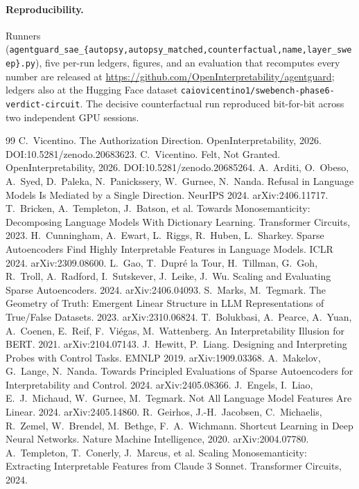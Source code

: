 \documentclass[11pt]{article}
\begin{document}
\paragraph{Reproducibility.} Runners (\texttt{agentguard\_sae\_\{autopsy,autopsy\_matched,counterfactual,name,layer\_sweep\}.py}),
five per-run ledgers, figures, and an evaluation that recomputes every number are released at
\url{https://github.com/OpenInterpretability/agentguard}; ledgers also at the Hugging Face dataset
\texttt{caiovicentino1/swebench-phase6-verdict-circuit}. The decisive counterfactual run reproduced
bit-for-bit across two independent GPU sessions.

\begin{thebibliography}{99}
 C.~Vicentino. The Authorization Direction. OpenInterpretability, 2026. DOI:10.5281/zenodo.20683623.
 C.~Vicentino. Felt, Not Granted. OpenInterpretability, 2026. DOI:10.5281/zenodo.20685264.
 A.~Arditi, O.~Obeso, A.~Syed, D.~Paleka, N.~Panickssery, W.~Gurnee, N.~Nanda. Refusal in Language Models Is Mediated by a Single Direction. NeurIPS 2024. arXiv:2406.11717.
 T.~Bricken, A.~Templeton, J.~Batson, et al. Towards Monosemanticity: Decomposing Language Models With Dictionary Learning. Transformer Circuits, 2023.
 H.~Cunningham, A.~Ewart, L.~Riggs, R.~Huben, L.~Sharkey. Sparse Autoencoders Find Highly Interpretable Features in Language Models. ICLR 2024. arXiv:2309.08600.
 L.~Gao, T.~Dupr\'e la Tour, H.~Tillman, G.~Goh, R.~Troll, A.~Radford, I.~Sutskever, J.~Leike, J.~Wu. Scaling and Evaluating Sparse Autoencoders. 2024. arXiv:2406.04093.
 S.~Marks, M.~Tegmark. The Geometry of Truth: Emergent Linear Structure in LLM Representations of True/False Datasets. 2023. arXiv:2310.06824.
 T.~Bolukbasi, A.~Pearce, A.~Yuan, A.~Coenen, E.~Reif, F.~Vi\'egas, M.~Wattenberg. An Interpretability Illusion for BERT. 2021. arXiv:2104.07143.
 J.~Hewitt, P.~Liang. Designing and Interpreting Probes with Control Tasks. EMNLP 2019. arXiv:1909.03368.
 A.~Makelov, G.~Lange, N.~Nanda. Towards Principled Evaluations of Sparse Autoencoders for Interpretability and Control. 2024. arXiv:2405.08366.
 J.~Engels, I.~Liao, E.~J.~Michaud, W.~Gurnee, M.~Tegmark. Not All Language Model Features Are Linear. 2024. arXiv:2405.14860.
 R.~Geirhos, J.-H.~Jacobsen, C.~Michaelis, R.~Zemel, W.~Brendel, M.~Bethge, F.~A.~Wichmann. Shortcut Learning in Deep Neural Networks. Nature Machine Intelligence, 2020. arXiv:2004.07780.
 A.~Templeton, T.~Conerly, J.~Marcus, et al. Scaling Monosemanticity: Extracting Interpretable Features from Claude 3 Sonnet. Transformer Circuits, 2024.
\end{thebibliography}
\end{document}
